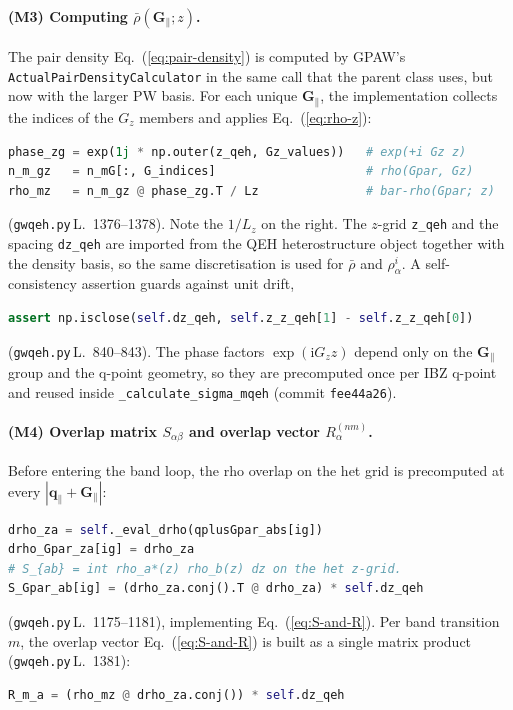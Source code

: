 \documentclass[11pt,a4paper]{article}
\newcommand{\Gpar}{\mathbf{G}_{\!\parallel}}
\newcommand{\qpar}{\mathbf{q}_{\parallel}}
\newcommand{\Gz}{G_{z}}
\newcommand{\im}{\mathrm{i}}
\newcommand{\eq}[1]{Eq.~(\ref{eq:#1})}
\begin{document}
\paragraph{(M3) Computing $\bar\rho(\Gpar;z)$.}  The pair density
\eq{pair-density} is computed by GPAW's
\texttt{ActualPairDensityCalculator} in the same call that the parent
class uses, but now with the larger PW basis.  For each unique
$\Gpar$, the implementation collects the indices of the $\Gz$ members
and applies \eq{rho-z}:
\begin{lstlisting}[language=Python]
phase_zg = exp(1j * np.outer(z_qeh, Gz_values))   # exp(+i Gz z)
n_m_gz   = n_mG[:, G_indices]                     # rho(Gpar, Gz)
rho_mz   = n_m_gz @ phase_zg.T / Lz               # bar-rho(Gpar; z)
\end{lstlisting}
(\texttt{gwqeh.py}\,L.~1376--1378).  Note the $1/L_z$ on the right.
The $z$-grid \texttt{z\_qeh} and the spacing \texttt{dz\_qeh} are
imported from the QEH heterostructure object together with the
density basis, so the same discretisation is used for $\bar\rho$ and
$\rho^{i}_{\alpha}$.  A self-consistency assertion guards against
unit drift,
\begin{lstlisting}[language=Python]
assert np.isclose(self.dz_qeh, self.z_z_qeh[1] - self.z_z_qeh[0])
\end{lstlisting}
(\texttt{gwqeh.py}\,L.~840--843).  The phase factors $\exp(\im\Gz z)$
depend only on the $\Gpar$ group and the q-point geometry, so they
are precomputed once per IBZ q-point and reused inside
\texttt{\_calculate\_sigma\_mqeh} (commit \texttt{fee44a26}).

\paragraph{(M4) Overlap matrix $S_{\alpha\beta}$ and overlap vector
$R^{(nm)}_{\alpha}$.}  Before entering the band loop, the rho
overlap on the het grid is precomputed at every $|\qpar+\Gpar|$:
\begin{lstlisting}[language=Python]
drho_za = self._eval_drho(qplusGpar_abs[ig])
drho_Gpar_za[ig] = drho_za
# S_{ab} = int rho_a*(z) rho_b(z) dz on the het z-grid.
S_Gpar_ab[ig] = (drho_za.conj().T @ drho_za) * self.dz_qeh
\end{lstlisting}
(\texttt{gwqeh.py}\,L.~1175--1181), implementing \eq{S-and-R}.  Per
band transition $m$, the overlap vector \eq{S-and-R} is built as a
single matrix product (\texttt{gwqeh.py}\,L.~1381):
\begin{lstlisting}[language=Python]
R_m_a = (rho_mz @ drho_za.conj()) * self.dz_qeh
\end{lstlisting}
\end{document}
